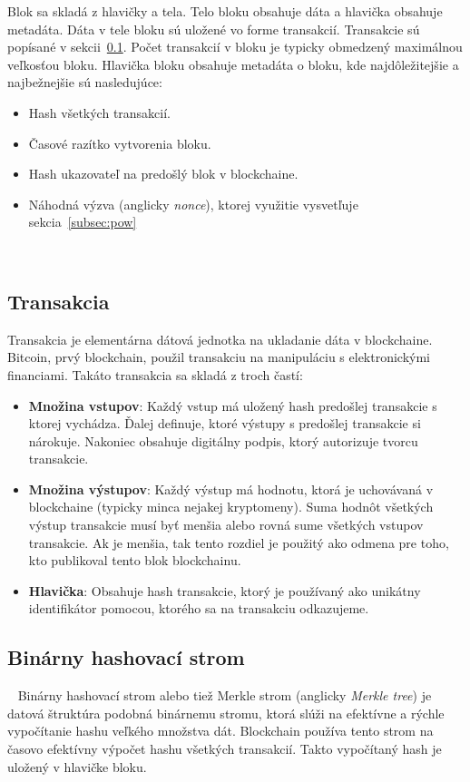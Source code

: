 Blok sa skladá z hlavičky a tela. Telo bloku obsahuje dáta a hlavička obsahuje metadáta. Dáta v tele bloku sú uložené vo forme transakcií. Transakcie sú popísané v sekcii~\ref{subsec:transaction}. Počet transakcií v bloku je typicky obmedzený maximálnou veľkosťou bloku.
Hlavička bloku obsahuje metadáta o bloku, kde najdôležitejšie a najbežnejšie sú nasledujúce:
\begin{itemize}
	\item Hash všetkých transakcií.
	\item Časové razítko vytvorenia bloku.
	\item Hash ukazovateľ na predošlý blok v blockchaine.
	\item Náhodná výzva (anglicky \textit{nonce}), ktorej využitie vysvetľuje sekcia~\ref{subsec:pow}
\end{itemize} 

~\cite{zhengBlockchainOverview}


\subsection{Transakcia}\label{subsec:transaction}
Transakcia je elementárna dátová jednotka na ukladanie dáta v blockchaine. Bitcoin, prvý blockchain, použil transakciu na manipuláciu s elektronickými financiami. Takáto transakcia sa skladá z troch častí:
\begin{itemize}
	\item \textbf{Množina vstupov}: Každý vstup má uložený hash predošlej transakcie s ktorej vychádza. Ďalej definuje, ktoré výstupy s predošlej transakcie si nárokuje. Nakoniec obsahuje digitálny podpis, ktorý autorizuje tvorcu transakcie.
	\item \textbf{Množina výstupov}: Každý výstup má hodnotu, ktorá je uchovávaná v blockchaine (typicky minca nejakej kryptomeny). Suma hodnôt všetkých výstup transakcie musí byť menšia alebo rovná sume všetkých vstupov transakcie. Ak je menšia, tak tento rozdiel je použitý ako odmena pre toho, kto publikoval tento blok blockchainu.
	\item \textbf{Hlavička}: Obsahuje hash transakcie, ktorý je používaný ako unikátny identifikátor pomocou, ktorého sa na transakciu odkazujeme.
\end{itemize}


\subsection{Binárny hashovací strom}~\label{subsec:merkle-tree}
Binárny hashovací strom alebo tiež Merkle strom (anglicky \textit{Merkle tree}) je datová štruktúra podobná binárnemu stromu, ktorá slúži na efektívne a rýchle vypočítanie hashu veľkého množstva dát. Blockchain používa tento strom na časovo efektívny výpočet hashu všetkých transakcií. Takto vypočítaný hash je uložený v hlavičke bloku.

